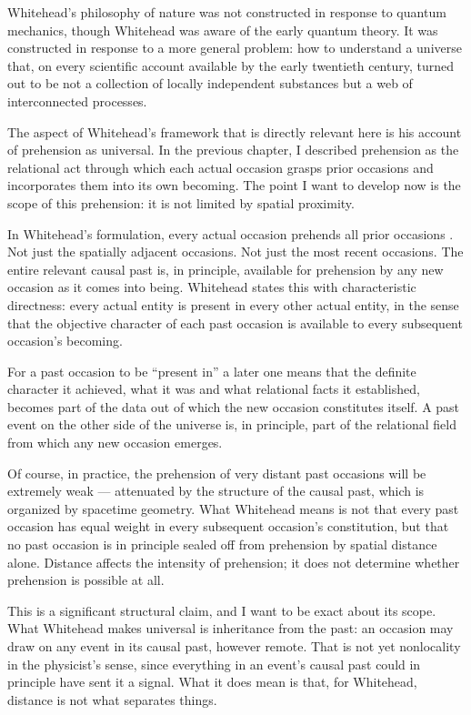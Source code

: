 Whitehead's philosophy of nature was not constructed in response to quantum mechanics, though Whitehead was aware of the early quantum theory. It was constructed in response to a more general problem: how to understand a universe that, on every scientific account available by the early twentieth century, turned out to be not a collection of locally independent substances but a web of interconnected processes.

The aspect of Whitehead's framework that is directly relevant here is his account of prehension as universal. In the previous chapter, I described prehension as the relational act through which each actual occasion grasps prior occasions and incorporates them into its own becoming. The point I want to develop now is the scope of this prehension: it is not limited by spatial proximity.

In Whitehead's formulation, every actual occasion prehends all prior occasions \citep{Whitehead1929}. Not just the spatially adjacent occasions. Not just the most recent occasions. The entire relevant causal past is, in principle, available for prehension by any new occasion as it comes into being. Whitehead states this with characteristic directness: every actual entity is present in every other actual entity, in the sense that the objective character of each past occasion is available to every subsequent occasion's becoming.

For a past occasion to be ``present in'' a later one means that the definite character it achieved, what it was and what relational facts it established, becomes part of the data out of which the new occasion constitutes itself. A past event on the other side of the universe is, in principle, part of the relational field from which any new occasion emerges.

Of course, in practice, the prehension of very distant past occasions will be extremely weak --- attenuated by the structure of the causal past, which is organized by spacetime geometry. What Whitehead means is not that every past occasion has equal weight in every subsequent occasion's constitution, but that no past occasion is in principle sealed off from prehension by spatial distance alone. Distance affects the intensity of prehension; it does not determine whether prehension is possible at all.

This is a significant structural claim, and I want to be exact about its scope. What Whitehead makes universal is inheritance from the past: an occasion may draw on any event in its causal past, however remote. That is not yet nonlocality in the physicist's sense, since everything in an event's causal past could in principle have sent it a signal. What it does mean is that, for Whitehead, distance is not what separates things.

